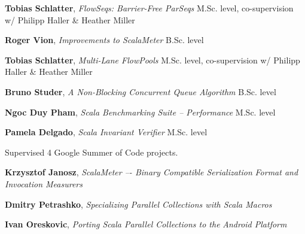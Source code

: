 \documentclass[9pt]{article}
\begin{document}
\noindent
{\bf Tobias Schlatter},
{\em FlowSeqs: Barrier-Free ParSeqs}
\newline\noindent M.Sc. level, co-supervision w/ Philipp Haller \& Heather Miller
\medskip

\noindent
{\bf Roger Vion},
{\em Improvements to ScalaMeter}
\newline\noindent B.Sc. level
\medskip

\noindent
{\bf Tobias Schlatter},
{\em Multi-Lane FlowPools}
\newline\noindent M.Sc. level, co-supervision w/ Philipp Haller \& Heather Miller
\medskip

\noindent
{\bf Bruno Studer},
{\em A Non-Blocking Concurrent Queue Algorithm}
\newline\noindent B.Sc. level
\medskip

\noindent
{\bf Ngoc Duy Pham},
{\em Scala Benchmarking Suite -- Performance}
\newline{}
\newline\noindent M.Sc. level
\medskip

\noindent
{\bf Pamela Delgado},
{\em Scala Invariant Verifier}
\newline\noindent M.Sc. level
\medskip

\bigskip

\medskip
{}


\noindent
Supervised 4 Google Summer of Code projects.
\newline

\noindent
{\bf Krzysztof Janosz},
{\em ScalaMeter –- Binary Compatible Serialization }
\newline\noindent
{\em Format and Invocation Measurers}
\dates{}
\medskip

\noindent
{\bf Dmitry Petrashko},
{\em Specializing Parallel Collections with Scala Macros }
\medskip

\noindent
{\bf Ivan Oreskovic},
{\em Porting Scala Parallel Collections to the }
\newline\noindent
{\em Android Platform}
\dates{}
\medskip
\end{document}
